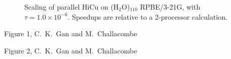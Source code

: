 \commentoutA{\documentclass[prb,aps,twocolumn,twocolumngrid]{revtex4}}
\begin{document}
{\begin{figure}[h]
\caption{Scaling of parallel HiCu on (H$_2$O)$_{110}$ RPBE/3-21G, with
$\tau = 1.0 \times 10^{-6}$. Speedups are relative to a 2-processor
calculation.}\label{fig:waterscaling}
\end{figure}

\pagebreak
\pagebreak
\pagebreak

\begin{center}
Figure 1, C.~K.~Gan and M.~Challacombe \\[1.cm]
\end{center}

\pagebreak
\begin{center}
Figure 2, C.~K.~Gan and M.~Challacombe \\[1.cm]
\end{center}

}
\end{document}
